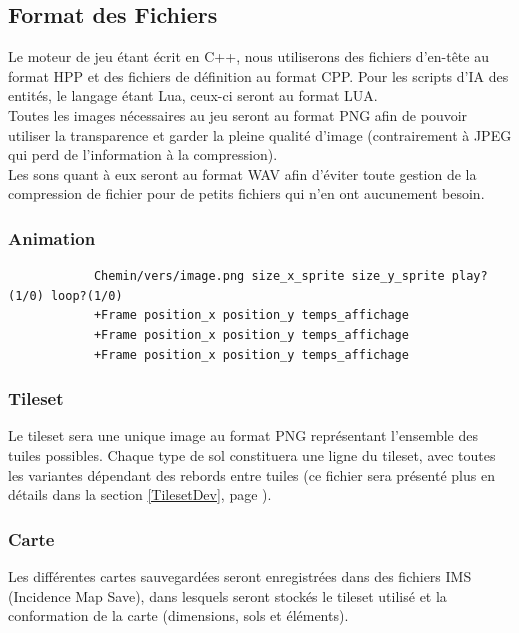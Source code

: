 \documentclass[a4paper]{article}
\newcommand{\alinea}{\hspace*{0.5cm}}
\begin{document}
      \subsection{Format des Fichiers}
	    \alinea Le moteur de jeu étant écrit en C++, nous utiliserons des fichiers d'en-tête au format HPP et des fichiers de définition au format CPP. Pour les scripts d'IA des entités, le langage étant Lua, ceux-ci seront au format LUA.\\
        \alinea Toutes les images nécessaires au jeu seront au format PNG afin de pouvoir utiliser la transparence et garder la pleine qualité d'image (contrairement à JPEG qui perd de l'information à la compression).\\
        \alinea Les sons quant à eux seront au format WAV afin d'éviter toute gestion de la compression de fichier pour de petits fichiers qui n'en ont aucunement besoin.

        \subsubsection{Animation}
          \begin{verbatim}
            Chemin/vers/image.png size_x_sprite size_y_sprite play?(1/0) loop?(1/0)
            +Frame position_x position_y temps_affichage
            +Frame position_x position_y temps_affichage
            +Frame position_x position_y temps_affichage
          \end{verbatim}
      
        \subsubsection{Tileset}
	      \alinea Le tileset sera une unique image au format PNG représentant l'ensemble des tuiles possibles. Chaque type de sol constituera une ligne du tileset, avec toutes les variantes dépendant des rebords entre tuiles (ce fichier sera présenté plus en détails dans la section \ref{TilesetDev}, page \pageref{TilesetDev}).

        \subsubsection{Carte}
	      \alinea Les différentes cartes sauvegardées seront enregistrées dans des fichiers IMS (Incidence Map Save), dans lesquels seront stockés le tileset utilisé et la conformation de la carte (dimensions, sols et éléments).
      
\end{document}
